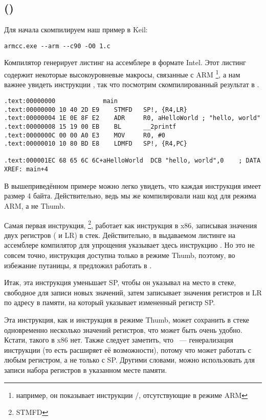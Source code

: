 \subsection{\NonOptimizingKeilVI (\ARMMode)}

Для начала скомпилируем наш пример в Keil:

\begin{lstlisting}
armcc.exe --arm --c90 -O0 1.c 
\end{lstlisting}

\index{\IntelSyntax}
Компилятор  генерирует листинг на ассемблере в формате Intel.
Этот листинг содержит некоторые высокоуровневые макросы, связанные с ARM
\footnote{например, он показывает инструкции \PUSH/\POP, отсутствующие в режиме ARM},
а нам важнее увидеть инструкции , так что посмотрим скомпилированный результат в \IDA.

\begin{lstlisting}[caption=\NonOptimizingKeilVI (\ARMMode) \IDA]
.text:00000000             main
.text:00000000 10 40 2D E9    STMFD   SP!, {R4,LR}
.text:00000004 1E 0E 8F E2    ADR     R0, aHelloWorld ; "hello, world"
.text:00000008 15 19 00 EB    BL      __2printf
.text:0000000C 00 00 A0 E3    MOV     R0, #0
.text:00000010 10 80 BD E8    LDMFD   SP!, {R4,PC}

.text:000001EC 68 65 6C 6C+aHelloWorld  DCB "hello, world",0    ; DATA XREF: main+4
\end{lstlisting}

В вышеприведённом примере можно легко увидеть, что каждая инструкция имеет размер 4 байта.
Действительно, ведь мы же компилировали наш код для режима ARM, а не Thumb.

Самая первая инструкция, \footnote{\ac{STMFD}},
работает как инструкция \PUSH в x86, записывая значения двух регистров ( и \ac{LR}) в стек.
Действительно, в выдаваемом листинге на ассемблере компилятор  для упрощения указывает здесь инструкцию
.
Но это не совсем точно, инструкция \PUSH доступна только в режиме Thumb, поэтому,
во избежание путаницы, я предложил работать в \IDA.

Итак, эта инструкция уменьшает \ac{SP}, чтобы он указывал на место в стеке, свободное для записи
новых значений, затем записывает значения регистров  и \ac{LR} 
по адресу в памяти, на который указывает измененный регистр \ac{SP}.

Эта инструкция, как и инструкция \PUSH в режиме Thumb, может сохранить в стеке одновременно несколько значений регистров, что может быть очень удобно.
Кстати, такого в x86 нет.
Также следует заметить, что ~--- генерализация инструкции \PUSH (то есть расширяет её возможности), потому что может работать с любым регистром, а не только с \ac{SP}.
Другими словами,  можно использовать для записи набора регистров в указанном месте памяти.

